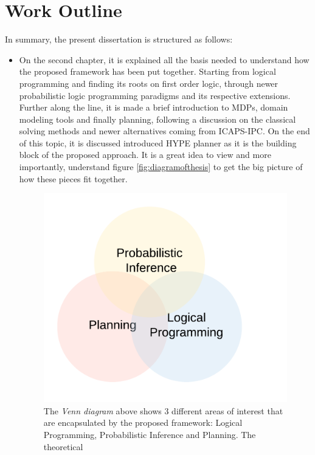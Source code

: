 \section{Work Outline}

In summary, the present dissertation is structured as follows:
\begin{itemize}
  \item On the second chapter, it is explained all the
  basis needed to understand how the proposed framework has been put together.
  Starting from logical programming and finding its roots on first order logic,
  through newer probabilistic logic programming paradigms and its respective
  extensions.
  Further along the line, it is made a brief introduction to \glspl{MDP},
  domain modeling tools and finally planning, following a discussion on the
  classical solving methods and newer alternatives coming from \gls{ICAPS-IPC}.
  On the end of this topic, it is discussed introduced \gls{HYPE} planner as it is the
  building block of the proposed approach.
  It is a great idea to view and more importantly, understand figure
  \ref{fig:diagramofthesis} to get the big picture of how these pieces fit
  together.
  \begin{figure}[H]
      \centering
          \includegraphics[scale=0.25]{images/venn}
          \caption{The \textit{Venn diagram} above shows 3 different areas of
          interest that are encapsulated by the proposed framework: Logical
          Programming, Probabilistic Inference and Planning. The theoretical
}
\end{figure}
\end{itemize}
